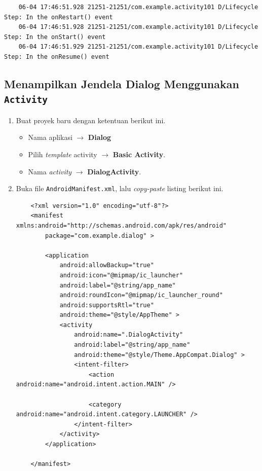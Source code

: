 \documentclass{scrartcl}
\begin{document}
\begin{enumerate}
	\begin{verbatim}
	06-04 17:46:51.928 21251-21251/com.example.activity101 D/Lifecycle Step: In the onRestart() event
	06-04 17:46:51.928 21251-21251/com.example.activity101 D/Lifecycle Step: In the onStart() event
	06-04 17:46:51.929 21251-21251/com.example.activity101 D/Lifecycle Step: In the onResume() event
	\end{verbatim}

\end{enumerate}

\subsection{Menampilkan Jendela Dialog Menggunakan \texttt{Activity}}

\begin{enumerate}
	\item Buat proyek baru dengan ketentuan berikut ini.
	\begin{itemize}
		\item Nama aplikasi $\rightarrow$ \textbf{Dialog}
		\item Pilih \textit{template} activity $\rightarrow$ \textbf{Basic Activity}.
		\item Nama \textit{activity} $\rightarrow$ \textbf{DialogActivity}.
	\end{itemize}
	
	\item Buka file \texttt{AndroidManifest.xml}, lalu \textit{copy-paste} listing berikut ini.
	
	\begin{verbatim}
	<?xml version="1.0" encoding="utf-8"?>
	<manifest xmlns:android="http://schemas.android.com/apk/res/android"
		package="com.example.dialog" >
		
		<application
			android:allowBackup="true"
			android:icon="@mipmap/ic_launcher"
			android:label="@string/app_name"
			android:roundIcon="@mipmap/ic_launcher_round"
			android:supportsRtl="true"
			android:theme="@style/AppTheme" >
			<activity
				android:name=".DialogActivity"
				android:label="@string/app_name"
				android:theme="@style/Theme.AppCompat.Dialog" >
				<intent-filter>
					<action android:name="android.intent.action.MAIN" />
					
					<category android:name="android.intent.category.LAUNCHER" />
				</intent-filter>
			</activity>
		</application>
	
	</manifest>
	\end{verbatim}
	

\end{enumerate}
\end{document}
